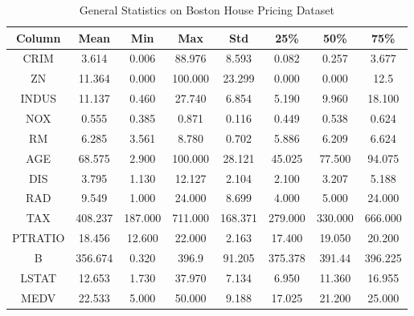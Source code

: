 \begin{table}[H]
    \centering
    \begin{tabular}{c|c|c|c|c|c|c|c}
          \hline
         Column & Mean & Min & Max & Std & 25\% & 50\% & 75\%  \\
        \hline
         CRIM & 3.614 & 0.006 & 88.976 & 8.593 & 0.082 & 0.257 & 3.677\\
         ZN & 11.364 & 0.000 & 100.000 & 23.299 & 0.000 & 0.000 & 12.5\\
         INDUS & 11.137 & 0.460 & 27.740 & 6.854 & 5.190 & 9.960 & 18.100\\
         NOX & 0.555 & 0.385 & 0.871 & 0.116 & 0.449 & 0.538 & 0.624\\
         RM & 6.285 & 3.561 & 8.780 & 0.702 & 5.886 & 6.209 & 6.624\\
         AGE & 68.575 & 2.900 & 100.000 & 28.121 & 45.025 & 77.500 & 94.075\\
         DIS & 3.795 & 1.130 & 12.127 & 2.104 & 2.100 & 3.207 & 5.188\\
         RAD & 9.549 & 1.000 & 24.000 & 8.699 & 4.000 & 5.000 & 24.000\\
         TAX & 408.237 & 187.000 & 711.000 & 168.371 & 279.000 & 330.000 & 666.000\\
         PTRATIO & 18.456 & 12.600 & 22.000 & 2.163 & 17.400 & 19.050 & 20.200\\
         B & 356.674 & 0.320 & 396.9 & 91.205 & 375.378 & 391.44 & 396.225\\
         LSTAT & 12.653 & 1.730 & 37.970 & 7.134 & 6.950 & 11.360 & 16.955\\
         MEDV & 22.533 & 5.000 & 50.000 & 9.188 & 17.025 & 21.200 & 25.000\\
    \end{tabular}
    \caption{General Statistics on Boston House Pricing Dataset}
    \label{tab:housing_table}
\end{table}